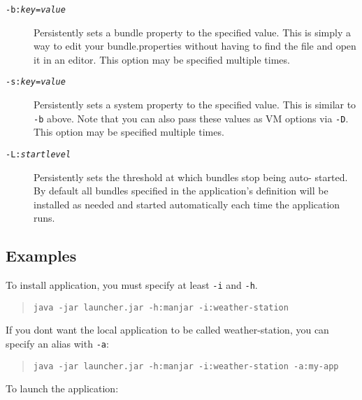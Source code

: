 \documentclass{report}
\begin{document}
\begin{description}
\item[\tt -b:{\it key}={\it value}] Persistently sets a bundle property to the 
specified value. This is simply a way to    edit your bundle.properties without 
having to find the file and open it in an editor. This option may be specified 
multiple times.
        
\item[\tt -s:{\it key}={\it value}] Persistently sets a system property to the 
specified value. This is similar to {\tt -b} above. Note that you can also pass 
these values as VM options via {\tt -D}. This option may be specified multiple 
times.
    
\item[\tt -L:{\it startlevel}] Persistently sets the threshold at which bundles 
stop being auto- started. By default all bundles specified in the application's 
definition will be installed as needed and started automatically each time the 
application runs.
            
\end{description}            
            
\subsection{Examples}
            
To install application, you must specify at least {\tt -i} and {\tt -h}.
    
\begin{quote}\begin{scriptsize}\begin{verbatim}
java -jar launcher.jar -h:manjar -i:weather-station
\end{verbatim}\end{scriptsize}\end{quote}
        
If you dont want the local application to be called weather-station, you can 
specify an alias with {\tt -a}:

\begin{quote}\begin{scriptsize}\begin{verbatim}    
java -jar launcher.jar -h:manjar -i:weather-station -a:my-app
\end{verbatim}\end{scriptsize}\end{quote}
        
To launch the application:
    
\end{document}
